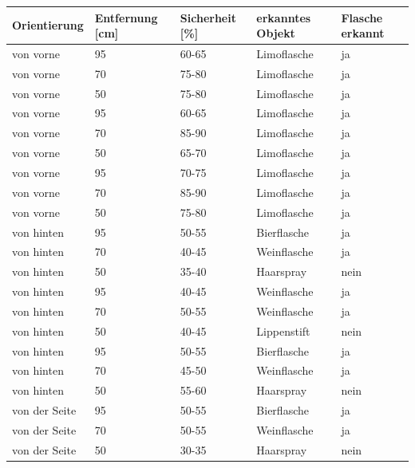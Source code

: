 \begin{table} [H]
	\centering
	\begin{tabular} {l l l l l}
Orientierung & Entfernung [cm] & Sicherheit [\%] & erkanntes Objekt & Flasche erkannt\\  \hline
von vorne&	95&	60-65&	Limoflasche\cellcolor{green}&ja\cellcolor{green}\\
von vorne&	70&	75-80&	Limoflasche\cellcolor{green}&ja\cellcolor{green}\\
von vorne&	50&	75-80&	Limoflasche\cellcolor{green}&ja\cellcolor{green}\\
von vorne&	95&	60-65&	Limoflasche\cellcolor{green}&ja\cellcolor{green}\\
von vorne&	70&	85-90&	Limoflasche\cellcolor{green}&ja\cellcolor{green}\\
von vorne&	50&	65-70&	Limoflasche\cellcolor{green}&ja\cellcolor{green}\\
von vorne&	95&	70-75&	Limoflasche\cellcolor{green}&ja\cellcolor{green}\\
von vorne&	70&	85-90&	Limoflasche\cellcolor{green}&ja\cellcolor{green}\\
von vorne&	50&	75-80&	Limoflasche\cellcolor{green}&ja\cellcolor{green}\\ \hline
von hinten&	95&	50-55&	Bierflasche\cellcolor{red}&ja\cellcolor{green}\\
von hinten&	70&	40-45&	Weinflasche\cellcolor{red}&ja\cellcolor{green}\\
von hinten&	50&	35-40&	Haarspray\cellcolor{red}&nein\cellcolor{red}\\
von hinten&	95&	40-45&	Weinflasche\cellcolor{red}&ja\cellcolor{green}\\
von hinten&	70&	50-55&	Weinflasche\cellcolor{red}&ja\cellcolor{green}\\
von hinten&	50&	40-45&	Lippenstift\cellcolor{red}&nein\cellcolor{red}\\
von hinten&	95&	50-55&	Bierflasche\cellcolor{red}&ja\cellcolor{green}\\
von hinten&	70&	45-50&	Weinflasche\cellcolor{red}&ja\cellcolor{green}\\
von hinten&	50&	55-60&	Haarspray\cellcolor{red}&nein\cellcolor{red}\\ \hline
von der Seite&	95&	50-55&	Bierflasche\cellcolor{red}&ja\cellcolor{green}\\
von der Seite&	70&	50-55&	Weinflasche\cellcolor{red}&ja\cellcolor{green}\\
von der Seite&	50&	30-35&	Haarspray\cellcolor{red}&nein\cellcolor{red}\\

\end{tabular}
\end{table}
